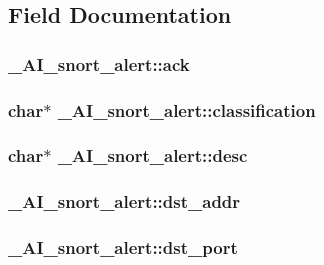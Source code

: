\subsection{Field Documentation}
\hypertarget{struct__AI__snort__alert_a2b185c678d3a7f1207b2119b0b567c37}{
\subsubsection[{ack}]{ {\bf \_\-AI\_\-snort\_\-alert::ack}}}
\label{struct__AI__snort__alert_a2b185c678d3a7f1207b2119b0b567c37}
\hypertarget{struct__AI__snort__alert_aa89585e14acb2c4e684a1552d322632f}{
\subsubsection[{classification}]{\setlength{\rightskip}{0pt plus 5cm}char$\ast$ {\bf \_\-AI\_\-snort\_\-alert::classification}}}
\label{struct__AI__snort__alert_aa89585e14acb2c4e684a1552d322632f}
\hypertarget{struct__AI__snort__alert_ac0902d7c756ec675fb06347ce4706135}{
\subsubsection[{desc}]{\setlength{\rightskip}{0pt plus 5cm}char$\ast$ {\bf \_\-AI\_\-snort\_\-alert::desc}}}
\label{struct__AI__snort__alert_ac0902d7c756ec675fb06347ce4706135}
\hypertarget{struct__AI__snort__alert_a69cc2ba171c8c808a0b45caa9426cd8c}{
\subsubsection[{dst\_\-addr}]{ {\bf \_\-AI\_\-snort\_\-alert::dst\_\-addr}}}
\label{struct__AI__snort__alert_a69cc2ba171c8c808a0b45caa9426cd8c}
\hypertarget{struct__AI__snort__alert_a6b323c07ae501d221e330e13646a96a3}{
\subsubsection[{dst\_\-port}]{ {\bf \_\-AI\_\-snort\_\-alert::dst\_\-port}}}
